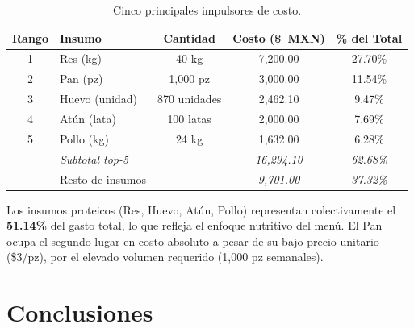 \documentclass[12pt]{report}
\begin{document}
\begin{table}[H]
\centering
\renewcommand{\arraystretch}{1.3}
\begin{tabular}{clccc}
\toprule
\textbf{Rango} & \textbf{Insumo} & \textbf{Cantidad} & \textbf{Costo (\$~MXN)} & \textbf{\% del Total} \\
\midrule
1 & Res (kg)        & 40 kg        & 7{,}200.00 & 27.70\% \\
2 & Pan (pz)        & 1{,}000 pz   & 3{,}000.00 & 11.54\% \\
3 & Huevo (unidad)  & 870 unidades & 2{,}462.10 &  9.47\% \\
4 & Atún (lata)     & 100 latas    & 2{,}000.00 &  7.69\% \\
5 & Pollo (kg)      & 24 kg        & 1{,}632.00 &  6.28\% \\
\midrule
  & \textit{Subtotal top-5} & & \textit{16{,}294.10} & \textit{62.68\%} \\
  & Resto de insumos        & & \textit{9{,}701.00}  & \textit{37.32\%} \\
\bottomrule
\end{tabular}
\caption{Cinco principales impulsores de costo.}
\label{tab:top5}
\end{table}

Los insumos proteicos (Res, Huevo, Atún, Pollo) representan colectivamente el
\textbf{51.14\%} del gasto total, lo que refleja el enfoque nutritivo del menú.
El Pan ocupa el segundo lugar en costo absoluto a pesar de su bajo precio unitario
(\$3/pz), por el elevado volumen requerido (1{,}000 pz semanales).



\section{Conclusiones}
\end{document}
